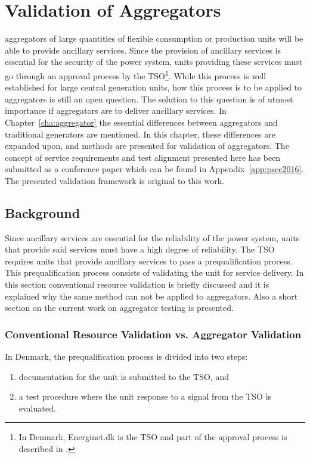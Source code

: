 \chapter{Validation of Aggregators}
\label{cha:validation}
 aggregators of large quantities of flexible consumption or production units will be able to provide ancillary services. Since the provision of ancillary services is essential for the security of the power system, units providing these services must go through an approval process by the TSO\footnote{In Denmark, Energinet.dk is the TSO and part of the approval process is described in \cite{EnerginetAncillary}.}. While this process is well established for large central generation units, how this process is to be applied to aggregators is still an open question. The solution to this question is of utmost importance if aggregators are to deliver ancillary services. In Chapter~\ref{cha:aggregator} the essential differences between aggregators and traditional generators are mentioned. In this chapter, these differences are expanded upon, and methods are presented for validation of aggregators. The concept of service requirements and test alignment presented here has been submitted as a conference paper which can be found in Appendix~\ref{app:pscc2016}. The presented validation framework is original to this work. 

\section{Background}
Since ancillary services are essential for the reliability of the power system, units that provide said services must have a high degree of reliability. The TSO requires units that provide ancillary services to pass a prequalification process. This prequalification process consists of validating the unit for service delivery. In this section conventional resource validation is briefly discussed and it is explained why the same method can not be applied to aggregators. Also a short section on the current work on aggregator testing is presented.
\subsection{Conventional Resource Validation vs. Aggregator Validation}
In Denmark, the prequalification process is divided into two steps:
\begin{enumerate}
	\item documentation for the unit is submitted to the TSO, and
	\item a test procedure where the unit response to a signal from the TSO is evaluated.
\end{enumerate}

